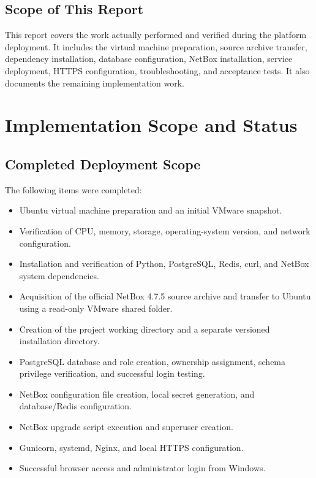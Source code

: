 \documentclass[11pt,a4paper,oneside]{report}
\begin{document}
\section{Scope of This Report}
This report covers the work actually performed and verified during the platform deployment. It includes the virtual machine preparation, source archive transfer, dependency installation, database configuration, NetBox installation, service deployment, HTTPS configuration, troubleshooting, and acceptance tests. It also documents the remaining implementation work.

\chapter{Implementation Scope and Status}

\section{Completed Deployment Scope}
The following items were completed:
\begin{itemize}
  \item Ubuntu virtual machine preparation and an initial VMware snapshot.
  \item Verification of CPU, memory, storage, operating-system version, and network configuration.
  \item Installation and verification of Python, PostgreSQL, Redis, curl, and NetBox system dependencies.
  \item Acquisition of the official NetBox 4.7.5 source archive and transfer to Ubuntu using a read-only VMware shared folder.
  \item Creation of the project working directory and a separate versioned installation directory.
  \item PostgreSQL database and role creation, ownership assignment, schema privilege verification, and successful login testing.
  \item NetBox configuration file creation, local secret generation, and database/Redis configuration.
  \item NetBox upgrade script execution and superuser creation.
  \item Gunicorn, systemd, Nginx, and local HTTPS configuration.
  \item Successful browser access and administrator login from Windows.
\end{itemize}
\end{document}
